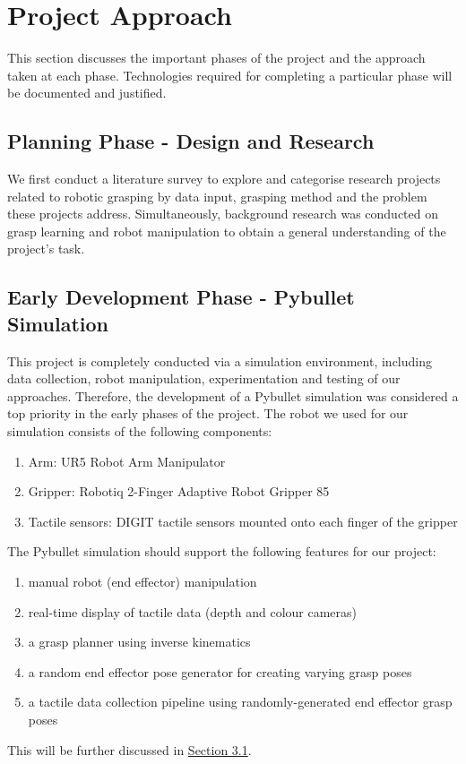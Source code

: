 \documentclass[11pt, a4paper]{report}
\begin{document}
\section{Project Approach}
\label{sec:1.4}
This section discusses the important phases of the project and the approach taken at each phase. Technologies required for completing a particular phase will be documented and justified.


\subsection{Planning Phase - Design and Research}
\label{sec:1.4.1}
We first conduct a literature survey to explore and categorise research projects related to robotic grasping by data input, grasping method and the problem these projects address. Simultaneously, background research was conducted on grasp learning \cite{platt2022grasp} and robot manipulation to obtain a general understanding of the project's task.


\subsection{Early Development Phase - Pybullet Simulation}
\label{sec:1.4.2}
This project is completely conducted via a simulation environment, including data collection, robot manipulation, experimentation and testing of our approaches. Therefore, the development of a Pybullet simulation was considered a top priority in the early phases of the project. The robot we used for our simulation consists of the following components:
\begin{enumerate}
    \item Arm: UR5 Robot Arm Manipulator
    \item Gripper: Robotiq 2-Finger Adaptive Robot Gripper 85
    \item Tactile sensors: DIGIT tactile sensors \cite{Lambeta2020DIGIT} mounted onto each finger of the gripper
\end{enumerate}
The Pybullet simulation should support the following features for our project:
\begin{enumerate}
    \item manual robot (end effector) manipulation
    \item real-time display of tactile data (depth and colour cameras)
    \item a grasp planner using inverse kinematics
    \item a random end effector pose generator for creating varying grasp poses
    \item a tactile data collection pipeline using randomly-generated end effector grasp poses
\end{enumerate}
\noindent This will be further discussed in \hyperref[sec:3.1]{Section 3.1}.
\end{document}
